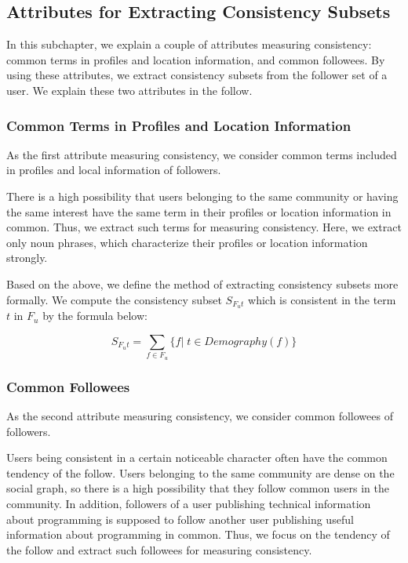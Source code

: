 \subsection{Attributes for Extracting Consistency Subsets}
\label{subsec:Attributes}

In this subchapter, we explain a couple of attributes measuring
consistency: common terms in profiles and location information, and
common followees.  By using these attributes, we extract consistency
subsets from the follower set of a user.  We explain these two
attributes in the follow.

\subsubsection{Common Terms in Profiles and Location Information}
\label{subsubsec:Terms}

As the first attribute measuring consistency, we consider common terms
included in profiles and local information of followers.

There is a high possibility that users belonging to the same community
or having the same interest have the same term in their profiles or
location information in common.  Thus, we extract such terms for
measuring consistency.  Here, we extract only noun phrases, which
characterize their profiles or location information strongly.

Based on the above, we define the method of extracting consistency
subsets more formally.  We compute the consistency subset $S_{F_ut}$
which is consistent in the term $t$ in $F_u$ by the formula below:

\vspace{-1ex}
\[
 S_{F_ut} =  \sum_{f \in F_u} \{f|\;t \in \mathit{Demography}(f) \}
\]
\vspace{-2ex}


\subsubsection{Common Followees}
\label{subsubsec:Followees}

As the second attribute measuring consistency, we consider common
followees of followers.

Users being consistent in a certain noticeable character often have
the common tendency of the follow.  Users belonging to the same
community are dense on the social graph, so there is a high possibility
that they follow common users in the community.  In addition, followers of
a user publishing technical information about programming is supposed
to follow another user publishing useful information about programming
in common.  Thus, we focus on the tendency of the follow and extract
such followees for measuring consistency.

